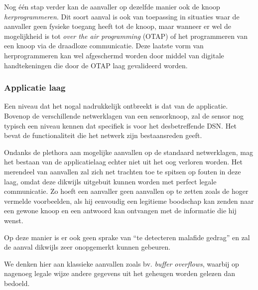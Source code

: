 Nog \'e\'en stap verder kan de aanvaller op dezelfde manier ook de knoop
\emph{herprogrammeren}. Dit soort aanval is ook van toepassing in situaties
waar de aanvaller geen fysieke toegang heeft tot de knoop, maar wanneer er wel
de mogelijkheid is tot \emph{over the air programming} (OTAP) of het
programmeren van een knoop via de draadloze communicatie. Deze laatste vorm van
herprogrammeren kan wel afgeschermd worden door middel van digitale
handtekeningen die door de OTAP laag gevalideerd worden.

\subsubsection*{Applicatie laag}

Een niveau dat het nogal nadrukkelijk ontbreekt is dat van de applicatie.
Bovenop de verschillende netwerklagen van een sensorknoop, zal de sensor nog
typisch een niveau kennen dat specifiek is voor het desbetreffende DSN. Het
bevat de functionaliteit die het netwerk zijn bestaansreden geeft.

Ondanks de plethora aan mogelijke aanvallen op de standaard netwerklagen, mag
het bestaan van de applicatielaag echter niet uit het oog verloren worden. Het
merendeel van aanvallen zal zich net trachten toe te spitsen op fouten in deze
laag, omdat deze dikwijls uitgebuit kunnen worden met perfect legale
communicatie. Zo hoeft een aanvaller geen aanvallen op te zetten zoals de hoger
vermelde voorbeelden, als hij eenvoudig een legitieme boodschap kan zenden naar
een gewone knoop en een antwoord kan ontvangen met de informatie die hij wenst.

Op deze manier is er ook geen sprake van ``te detecteren malafide gedrag'' en
zal de aanval dikwijls zeer onopgemerkt kunnen gebeuren.

We denken hier aan klassieke aanvallen zoals bv. \emph{buffer overflows},
waarbij op nagenoeg legale wijze andere gegevens uit het geheugen worden
gelezen dan bedoeld.
